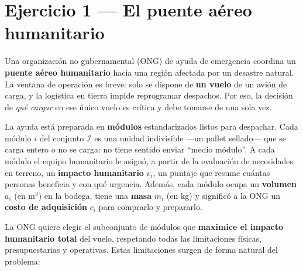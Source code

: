 \documentclass[11pt]{article}
\begin{document}
\newpage

\section{Ejercicio 1 — El puente aéreo humanitario}

Una organización no gubernamental (ONG) de ayuda de emergencia coordina un \textbf{puente aéreo humanitario} hacia una región afectada por un desastre natural. La ventana de operación es breve: solo se dispone de \textbf{un vuelo} de un avión de carga, y la logística en tierra impide reprogramar despachos. Por eso, la decisión de \emph{qué cargar} en ese único vuelo es crítica y debe tomarse de una sola vez.

La ayuda está preparada en \textbf{módulos} estandarizados listos para despachar. Cada módulo $i$ del conjunto $\mathcal{I}$ es una unidad indivisible —un pallet sellado— que se carga entero o no se carga: no tiene sentido enviar ``medio módulo''. A cada módulo el equipo humanitario le asignó, a partir de la evaluación de necesidades en terreno, un \textbf{impacto humanitario} $v_i$, un puntaje que resume cuántas personas beneficia y con qué urgencia. Además, cada módulo ocupa un \textbf{volumen} $a_i$ (en $\text{m}^3$) en la bodega, tiene una \textbf{masa} $m_i$ (en kg) y significó a la ONG un \textbf{costo de adquisición} $c_i$ para comprarlo y prepararlo.

La ONG quiere elegir el subconjunto de módulos que \textbf{maximice el impacto humanitario total} del vuelo, respetando todas las limitaciones físicas, presupuestarias y operativas. Estas limitaciones surgen de forma natural del problema:
\end{document}

